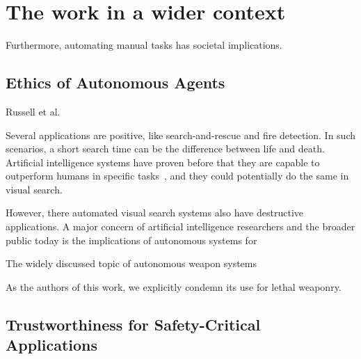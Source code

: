 \section{The work in a wider context}

% 

Furthermore, automating manual tasks has societal implications.


\subsection{Ethics of Autonomous Agents}

Russell et al.~\cite{russell_priorities_2015}

\cite{vinuesa_sustainable_2020}


\cite{russell_ethics_2015}

\cite{russell_beneficial_2022}

\cite{brundage_malicious_2018}

Several applications are positive, like search-and-rescue and fire detection.
In such scenarios, a short search time can be the difference between life and death.
Artificial intelligence systems have proven before that they are capable to outperform humans in specific tasks~\cite{silver_alphago_2016,vinyals_alphastar_2019}, and they could potentially do the same in visual search.

However, there automated visual search systems also have destructive applications.
A major concern of artificial intelligence researchers and the broader public today is the implications of autonomous systems for 

The widely discussed topic of autonomous weapon systems


As the authors of this work, we explicitly condemn its use for lethal weaponry.

\subsection{Trustworthiness for Safety-Critical Applications}

